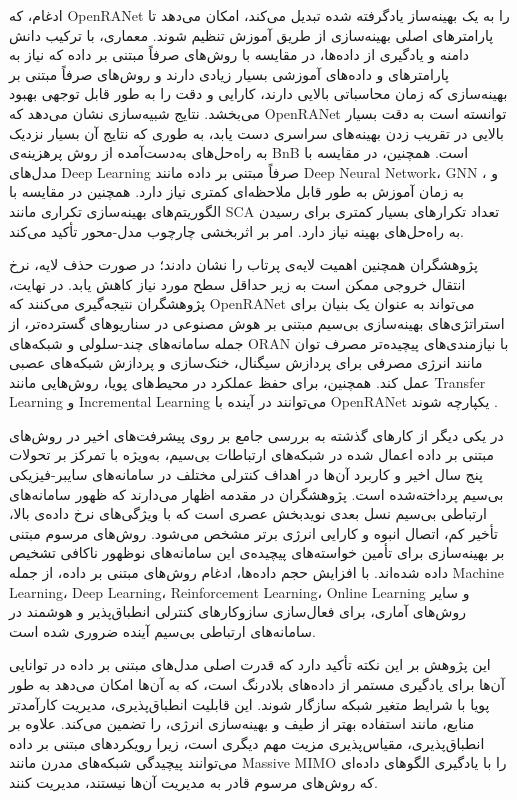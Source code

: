 ادغام، که OpenRANet را به یک بهینه‌ساز یادگرفته شده تبدیل می‌کند، امکان می‌دهد تا پارامترهای اصلی بهینه‌سازی از طریق آموزش تنظیم شوند.  معماری، با ترکیب دانش دامنه و یادگیری از داده‌ها، در مقایسه با روش‌های صرفاً مبتنی بر داده که نیاز به پارامترهای و داده‌های آموزشی بسیار زیادی دارند و روش‌های صرفاً مبتنی بر بهینه‌سازی که زمان محاسباتی بالایی دارند، کارایی و دقت را به طور قابل توجهی بهبود می‌بخشد.
نتایج شبیه‌سازی نشان می‌دهد که OpenRANet توانسته‌ است به دقت بسیار بالایی در تقریب زدن بهینه‌های سراسری دست یابد، به طوری که نتایج آن بسیار نزدیک به راه‌حل‌های به‌دست‌آمده از روش پرهزینه‌ی 
\gls{BnB}
است. همچنین، در مقایسه با مدل‌های 
\gls{Deep Learning}
صرفاً مبتنی بر داده مانند 
\gls{Deep Neural Network}،
\gls{GNN} و 
، 
به زمان آموزش به طور قابل ملاحظه‌ای کمتری نیاز دارد. همچنین 
در مقایسه با الگوریتم‌های بهینه‌سازی تکراری مانند 
\gls{SCA}
تعداد تکرارهای بسیار کمتری برای رسیدن به راه‌حل‌های بهینه نیاز دارد.  امر بر اثربخشی چارچوب مدل-محور تأکید می‌کند. 

پژوهشگران همچنین اهمیت لایه‌ی پرتاب را نشان دادند؛ در صورت حذف  لایه، نرخ انتقال خروجی ممکن است به زیر حداقل سطح مورد نیاز کاهش یابد.
در نهایت، پژوهشگران نتیجه‌گیری می‌کنند که OpenRANet می‌تواند به عنوان یک بنیان برای استراتژی‌های بهینه‌سازی بی‌سیم مبتنی بر هوش مصنوعی در سناریوهای گسترده‌تر، از جمله سامانه‌های چند-سلولی و شبکه‌های ORAN با نیازمندی‌های پیچیده‌تر مصرف توان مانند انرژی مصرفی برای پردازش سیگنال، خنک‌سازی و پردازش شبکه‌های عصبی عمل کند. همچنین، برای حفظ عملکرد در محیط‌های پویا، روش‌هایی مانند 
\gls{Transfer Learning}
و 
\gls{Incremental Learning}
می‌توانند در آینده با OpenRANet یکپارچه شوند
\cite{OpenRANet}.


در یکی دیگر از کارهای گذشته به بررسی جامع بر روی پیشرفت‌های اخیر در روش‌های مبتنی بر داده اعمال شده در شبکه‌های ارتباطات بی‌سیم، به‌ویژه با تمرکز بر تحولات پنج سال اخیر و کاربرد آن‌ها در اهداف کنترلی مختلف در سامانه‌های سایبر-فیزیکی بی‌سیم پرداخته‌شده است.
پژوهشگران در مقدمه اظهار می‌دارند که ظهور سامانه‌های ارتباطی بی‌سیم نسل بعدی نویدبخش عصری است که با ویژگی‌های نرخ داده‌ی بالا، تأخیر کم، اتصال انبوه و کارایی انرژی برتر مشخص می‌شود. روش‌های مرسوم مبتنی بر بهینه‌سازی برای تأمین خواسته‌های پیچیده‌ی این سامانه‌های نوظهور ناکافی تشخیص داده شده‌اند. با افزایش حجم داده‌ها، ادغام روش‌های مبتنی بر داده، از جمله 
\gls{Machine Learning}، 
\gls{Deep Learning}، 
\gls{Reinforcement Learning}،
\gls{Online Learning}
و سایر روش‌های آماری، برای فعال‌سازی سازوکار‌های کنترلی انطباق‌پذیر و هوشمند در سامانه‌های ارتباطی بی‌سیم آینده ضروری شده است.

این پژوهش بر این نکته تأکید دارد که قدرت اصلی مدل‌های مبتنی بر داده در توانایی آن‌ها برای یادگیری مستمر از داده‌های بلادرنگ است، که به آن‌ها امکان می‌دهد به طور پویا با شرایط متغیر شبکه سازگار شوند. این قابلیت انطباق‌پذیری، مدیریت کارآمدتر منابع، مانند استفاده بهتر از طیف و بهینه‌سازی انرژی، را تضمین می‌کند. علاوه بر انطباق‌پذیری، مقیاس‌پذیری مزیت مهم دیگری است، زیرا رویکردهای مبتنی بر داده می‌توانند پیچیدگی شبکه‌های مدرن مانند Massive MIMO را با یادگیری الگوهای داده‌ای که روش‌های مرسوم قادر به مدیریت آن‌ها نیستند، مدیریت کنند.

